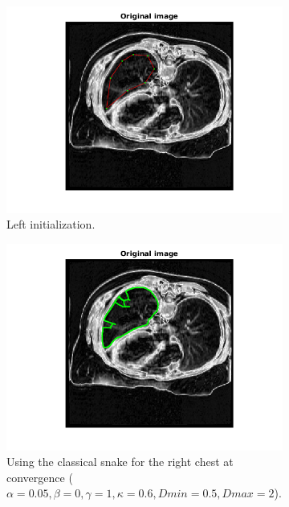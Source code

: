 \documentclass{article}
\begin{document}
\begin{figure}[H]
\centering
\begin{subfigure}{0.45\textwidth}
  \centering
  \includegraphics[width=\linewidth]{newLeftinit.png}
  \caption{Left initialization.}
  \label{a}
\end{subfigure}
\begin{subfigure}{0.45\textwidth}
  \centering
  \includegraphics[width=\linewidth]{newLeftclassical.png}
  \caption{Using the classical snake for the right chest at convergence ($\alpha=0.05, \beta=0, \gamma=1,\kappa=0.6,Dmin=0.5,Dmax=2$).}
  \label{b}
\end{subfigure}
\begin{subfigure}{0.45\textwidth}
  \centering

\end{subfigure}
\end{figure}
\end{document}
